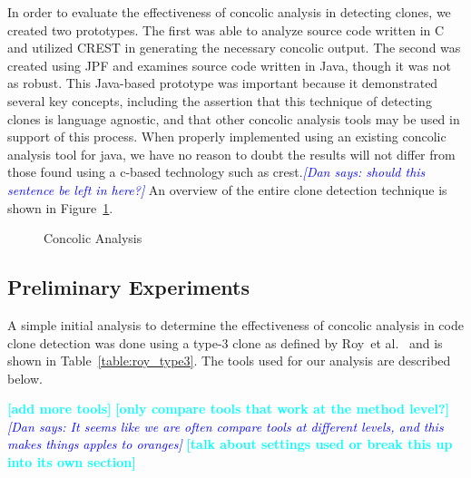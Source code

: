 \documentclass[smallextended]{svjour3}       %
\newcommand{\todo}[1]{\textcolor{cyan}{\textbf{[#1]}}}
\newcommand{\dan}[1]{\textcolor{blue}{{\it [Dan says: #1]}}}
\begin{document}
In order to evaluate the effectiveness of concolic analysis in detecting clones, we created two prototypes. The first was able to analyze source code written in C and utilized CREST in generating the necessary concolic output. The second was created using JPF and examines source code written in Java, though it was not as robust. This Java-based prototype was important because it demonstrated several key concepts, including the assertion that this technique of detecting clones is language agnostic, and that other concolic analysis tools may be used in support of this process. When properly implemented using an existing concolic analysis tool for java, we have no reason to doubt the results will not differ from those found using a c-based technology such as crest.\dan{should this sentence be left in here?} An overview of the entire clone detection technique is shown in Figure~\ref{fig:concolicdiscoveryprocess}.


\begin{figure}
\centering
{}
\caption{Concolic Analysis} \label{fig:concolicdiscoveryprocess}
\end{figure}


\subsection{Preliminary Experiments}

A simple initial analysis to determine the effectiveness of concolic analysis in code clone detection was done using a type-3 clone as defined by Roy~et al.~\cite{Roy:2009:CEC:1530898.1531101} and is shown in Table~\ref{table:roy_type3}. The tools used for our analysis are described below.


\todo{add more tools}
\todo{only compare tools that work at the method level?}\dan{It seems like we are often compare tools at different levels, and this makes things apples to oranges}
\todo{talk about settings used or break this up into its own section} %
\end{document}
